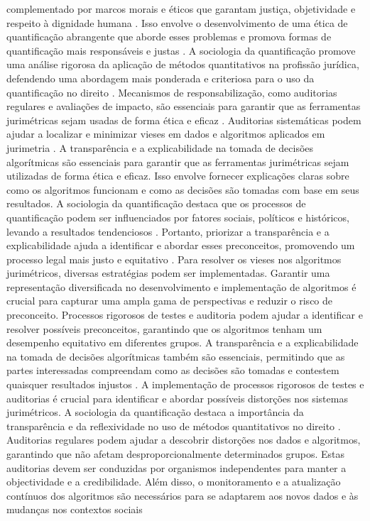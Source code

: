 \begin{agradecimentos}
complementado por marcos morais e éticos que garantam justiça, objetividade e respeito à dignidade humana \cite{10.1590/dados.2022.65.3.267,salais2016quantification}. Isso envolve o desenvolvimento de uma ética de quantificação abrangente que aborde esses problemas e promova formas de quantificação mais responsáveis e justas \cite{10.1057/s41599-020-0396-5,10.1057/s41599-020-00557-0}. A sociologia da quantificação promove uma análise rigorosa da aplicação de métodos quantitativos na profissão jurídica, defendendo uma abordagem mais ponderada e criteriosa para o uso da quantificação no direito \cite{10.1007/s11186-021-09453-1,salais2016quantification}. Mecanismos de responsabilização, como auditorias regulares e avaliações de impacto, são essenciais para garantir que as ferramentas jurimétricas sejam usadas de forma ética e eficaz \cite{10.1007/s11186-021-09453-1,1023071190721}. Auditorias sistemáticas podem ajudar a localizar e minimizar vieses em dados e algoritmos aplicados em jurimetria \cite{10.1590/dados.2022.65.3.267,inthelawviewmetadatacitationsimilarpapers2014}. A transparência e a explicabilidade na tomada de decisões algorítmicas são essenciais para garantir que as ferramentas jurimétricas sejam utilizadas de forma ética e eficaz. Isso envolve fornecer explicações claras sobre como os algoritmos funcionam e como as decisões são tomadas com base em seus resultados. A sociologia da quantificação destaca que os processos de quantificação podem ser influenciados por fatores sociais, políticos e históricos, levando a resultados tendenciosos \cite{10.1007/s11186-021-09453-1,1023071190721}. Portanto, priorizar a transparência e a explicabilidade ajuda a identificar e abordar esses preconceitos, promovendo um processo legal mais justo e equitativo \cite{10.1007/s11186-021-09453-1,1023071190721}. Para resolver os vieses nos algoritmos jurimétricos, diversas estratégias podem ser implementadas. Garantir uma representação diversificada no desenvolvimento e implementação de algoritmos é crucial para capturar uma ampla gama de perspectivas e reduzir o risco de preconceito. Processos rigorosos de testes e auditoria podem ajudar a identificar e resolver possíveis preconceitos, garantindo que os algoritmos tenham um desempenho equitativo em diferentes grupos. A transparência e a explicabilidade na tomada de decisões algorítmicas também são essenciais, permitindo que as partes interessadas compreendam como as decisões são tomadas e contestem quaisquer resultados injustos \cite{unger2021process}. A implementação de processos rigorosos de testes e auditorias é crucial para identificar e abordar possíveis distorções nos sistemas jurimétricos. A sociologia da quantificação destaca a importância da transparência e da reflexividade no uso de métodos quantitativos no direito \cite{10.1007/s11186-021-09453-1,10.1057/s41599-020-0396-5}. Auditorias regulares podem ajudar a descobrir distorções nos dados e algoritmos, garantindo que não afetam desproporcionalmente determinados grupos. Estas auditorias devem ser conduzidas por organismos independentes para manter a objectividade e a credibilidade. Além disso, o monitoramento e a atualização contínuos dos algoritmos são necessários para se adaptarem aos novos dados e às mudanças nos contextos sociais 
\end{agradecimentos}
